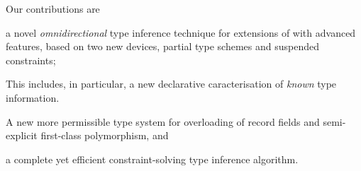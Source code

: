 \documentclass[acmsmall,screen,nonacm]{acmart}
\begin{document}
Our contributions are 
\begin{enumerate*}
\item
  a novel \emph{omnidirectional} type inference technique for
  extensions of \ML with advanced features, based on two new devices,
  partial type schemes and suspended constraints;


\item
  This includes, in particular, a new declarative caracterisation of
  \emph{known} type information.
  

\item
  A new more permissible type system for overloading of record fields and
  semi-explicit first-class polymorphism, and

\item
  a complete yet efficient constraint-solving type inference algorithm.
  
\end{enumerate*}
\end{document}
